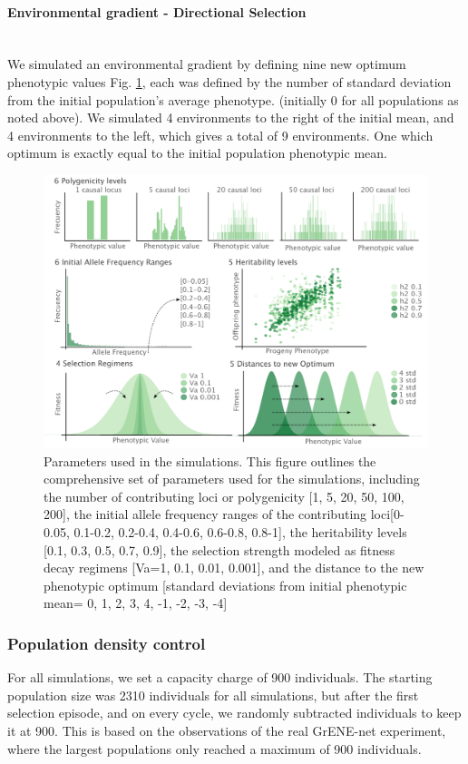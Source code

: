 \documentclass{article}
\let\oldparagraph\paragraph
\renewcommand{\paragraph}[1]{\oldparagraph{#1}\mbox{}\\}
\begin{document}
\paragraph{Environmental gradient - Directional Selection}
We simulated an environmental gradient by defining nine new optimum phenotypic values Fig. \ref{fig:parameters}, each was defined by the number of standard deviation from the initial population's average phenotype. (initially 0 for all populations as noted above). We simulated 4 environments to the right of the initial mean, and 4 environments to the left, which gives a total of 9 environments. One which optimum is exactly equal to the initial population phenotypic mean. 

\begin{figure}[h]
  \centering
  \includegraphics[width=1\textwidth]{figures/parameters.pdf}
  \caption{Parameters used in the simulations. This figure outlines the comprehensive set of parameters used for the simulations, including the number of contributing loci or polygenicity [1, 5, 20, 50, 100, 200], the initial allele frequency ranges of the contributing loci[0-0.05, 0.1-0.2, 0.2-0.4, 0.4-0.6, 0.6-0.8, 0.8-1], the heritability levels [0.1, 0.3, 0.5, 0.7, 0.9], the selection strength modeled as fitness decay regimens [Va=1, 0.1, 0.01, 0.001], and the distance to the new phenotypic optimum [standard deviations from initial phenotypic mean= 0, 1, 2, 3, 4, -1, -2, -3, -4]}
  \label{fig:parameters}
\end{figure}

\subsubsection{Population density control}
For all simulations, we set a capacity charge of 900 individuals. The starting population size was 2310 individuals for all simulations, but after the first selection episode, and on every cycle, we randomly subtracted individuals to keep it at 900. This is based on the observations of the real GrENE-net experiment, where the largest populations only reached a maximum of 900 individuals. 
\end{document}
